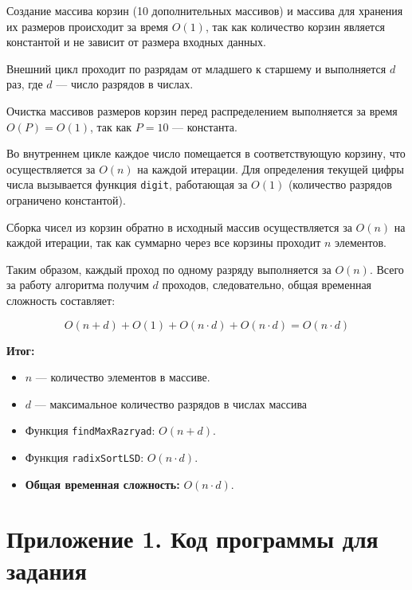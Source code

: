 \documentclass[otchet]{SCWorks}
\begin{document}
Создание массива корзин (10 дополнительных массивов) и массива для хранения их размеров происходит за время $O(1)$, так как количество корзин является константой и не зависит от размера входных данных.

Внешний цикл проходит по разрядам от младшего к старшему и выполняется $d$ раз, где $d$ --- число разрядов в числах.

Очистка массивов размеров корзин перед распределением выполняется за время $O(P) = O(1)$, так как $P = 10$ — константа.

Во внутреннем цикле каждое число помещается в соответствующую корзину, что осуществляется за $O(n)$ на каждой итерации. Для определения текущей цифры числа вызывается функция \texttt{digit}, работающая за $O(1)$ (количество разрядов ограничено константой).

Сборка чисел из корзин обратно в исходный массив осуществляется за $O(n)$ на каждой итерации, так как суммарно через все корзины проходит $n$ элементов.

Таким образом, каждый проход по одному разряду выполняется за $O(n)$. Всего за работу алгоритма получим $d$ проходов, следовательно, общая временная сложность составляет:

\[
O(n + d) + O(1) + O(n \cdot d) + O(n \cdot d) = O(n \cdot d)
\]

\textbf{Итог:}
\begin{itemize}
    \item $n$ — количество элементов в массиве.
    \item $d$ — максимальное количество разрядов в числах массива
    \item Функция \texttt{findMaxRazryad}: $O(n + d)$.
    \item Функция \texttt{radixSortLSD}: $O(n \cdot d)$.
    \item \textbf{Общая временная сложность:} $O(n \cdot d)$.
\end{itemize}
\newpage

\section{Приложение 1. Код программы для задания}
\end{document}
